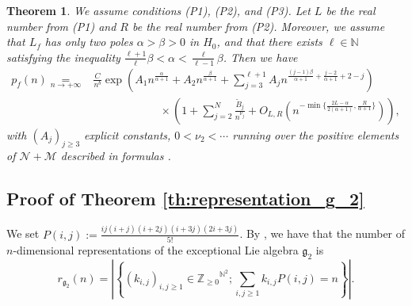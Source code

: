 \documentclass[a4paper]{amsart}
\newtheorem{theorem}{Theorem}
\theoremstyle{remark}
\theoremstyle{definition}
\begin{document}
\begin{theorem}
\cite[Theorem 4.4]{bridges2024asymptotic}
\label{theorem:meinardus_type_theorem}
We assume conditions (P1), (P2), and (P3). Let $L$ be the real number from (P1) and $R$ be the real number from (P2). Moreover, we assume that $L_f$ has only two poles $\alpha > \beta > 0$ in $H_0$, and that there exists $\ell \in \mathbb{N}$ satisfying the inequality $\frac{\ell+1}{\ell}\beta < \alpha < \frac{\ell}{\ell-1}\beta$. Then we have
\begin{align*}
    p_f(n) \underset{n \to +\infty}{=}& \frac{C}{n^b} \exp \left( A_1 n^{\frac{\alpha}{\alpha+1}}+ A_2 n^{\frac{\beta}{\alpha+1}}+ \sum_{j=3}^{\ell+1} A_j n^{\frac{(j-1)\beta}{\alpha+1}+\frac{j-2}{\alpha+1}+2-j} \right) \\
    & \qquad \qquad \qquad \times \left( 1+ \sum_{j=2}^N \frac{\widetilde{B}_j}{n^{\nu_j}} + O_{L,R} \left( n^{-\min \{ \frac{2L-\alpha}{2(\alpha+1)},\frac{R}{\alpha+1} \}} \right)\right),
\end{align*}
with $(A_j)_{j \geq 3}$ explicit constants, $0<\nu_2<\cdots$ running over the positive elements of $\mathcal{N}+\mathcal{M}$ described in formulas \cite[(1.9),(1.10)]{bridges2024asymptotic}.
\end{theorem}

\subsection{Proof of Theorem \ref{th:representation_g_2}}
\label{subsection:proof_number_representation_g2}

We set $P(i,j):=\frac{ij(i+j)(i+2j)(i+3j)(2i+3j)}{5!}$. By \cite[§24.3]{humphreys1972lie}, we have that the number of $n$-dimensional representations of the exceptional Lie algebra $\mathfrak{g}_2$ is
$$ r_{\mathfrak{g}_2}(n) = \left| \left \{ (k_{i,j})_{i,j \geq 1} \in {\mathbb{Z}_{\geq 0}}^{{\mathbb{N}}^2}; \sum_{i,j \geq 1} k_{i,j} P(i,j) =n \right \} \right|. $$
\end{document}
